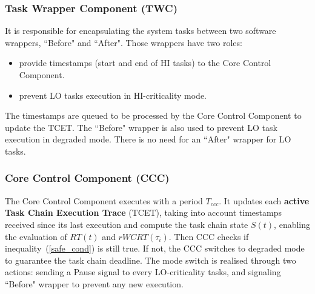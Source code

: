 \documentclass[french, a4paper, 11pt, twoside, pdftex]{StyleThese}
\begin{document}
        \subsubsection{Task Wrapper Component (TWC)} It is responsible for encapsulating the system tasks between two software wrappers, ``Before" and ``After". Those wrappers have two roles: \begin{itemize}
                \item provide timestamps (start and end of HI tasks) to the Core Control Component.
                \item prevent LO tasks execution in HI-criticality mode.
            \end{itemize}
            

        The timestamps are queued to be processed by the Core Control Component to update the TCET.
        The ``Before" wrapper is also used to prevent LO task execution in degraded mode. There is no need for an ``After" wrapper for LO tasks.

        \subsubsection{Core Control Component (CCC)}
           The Core Control Component executes with a period $T_{ccc}$. It updates each \textbf{active Task Chain Execution Trace} (TCET), taking into account timestamps received since its last execution and compute the task chain state $S(t)$, enabling the evaluation of $RT(t)$ and $rWCRT(\tau_i)$. Then CCC checks if inequality~(\ref{safe_cond}) is still true. If not, the CCC switches to degraded mode to guarantee the task chain deadline. The mode switch is realised through two actions: sending a Pause signal to every LO-criticality tasks, and signaling ``Before" wrapper to prevent any new execution.
        
\end{document}
